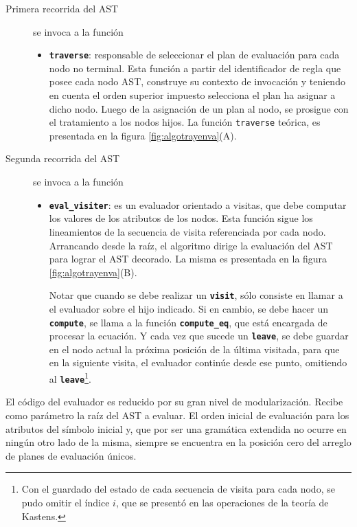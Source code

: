 \documentclass[runningheads,a4paper]{llncs}
\newcommand{\textbtt}[1]{\texttt{\textbf{#1}}}
\begin{document}
\begin{description}
\item [Primera recorrida del AST] se invoca a la función
\begin{itemize}
\item \textbtt{traverse}: responsable de seleccionar el plan de evaluación para cada nodo no terminal. Esta función a partir del identificador de regla que posee cada nodo AST, construye su contexto de invocación y teniendo en cuenta el orden superior impuesto selecciona el plan ha asignar a dicho nodo. Luego de la asignación de un plan al nodo, se prosigue con el tratamiento a los nodos hijos. La función \texttt{traverse} teórica, es presentada en la figura \ref{fig:algotrayenva}(A).
\end{itemize}

\item [Segunda recorrida del AST] se invoca a la función
\begin{itemize}
\item \textbtt{eval\_visiter}: es un evaluador orientado a visitas, que debe computar los valores de los atributos de los nodos. Esta función sigue los lineamientos de la secuencia de visita referenciada por cada nodo. Arrancando desde la raíz, el algoritmo dirige la evaluación del AST para lograr el AST decorado. La misma es presentada en la figura \ref{fig:algotrayenva}(B).

Notar que cuando se debe realizar un \textbtt{visit}, sólo consiste en llamar a el evaluador sobre el hijo indicado. Si en cambio, se debe hacer un \textbtt{compute}, se llama a la función \textbtt{compute\_eq}, que está encargada de procesar la ecuación. Y cada vez que sucede un \textbtt{leave}, se debe guardar en el nodo actual la próxima posición de la última visitada, para que en la siguiente visita, el evaluador continúe desde ese punto, omitiendo al \textbtt{leave}\footnote{Con el guardado del estado de cada secuencia de visita para cada nodo, se pudo omitir el índice $i$, que se presentó en las operaciones de la teoría de Kastens.}.
\end{itemize}
\end{description}

El código del evaluador es reducido por su gran nivel de modularización. Recibe como parámetro la raíz del AST a evaluar. El orden inicial de evaluación para los atributos del símbolo inicial y, que por ser una gramática extendida no ocurre en ningún otro lado de la misma, siempre se encuentra en la posición cero del arreglo de planes de evaluación únicos.
\end{document}
